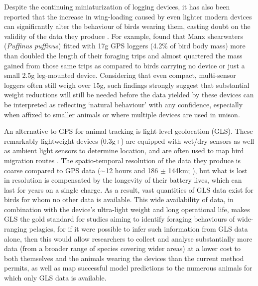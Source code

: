 \documentclass[11pt]{article}
\begin{document}
    Despite the continuing miniaturization of logging devices, it has also been reported that the increase in wing-loading caused by even lighter modern devices can significantly alter the behaviour of birds wearing them, casting doubt on the validity of the data they produce \citep{barron2010meta,phillips2003effects,calvo1992review,jackson2002potential}. For example, \cite{gillies2020short} found that Manx shearwaters (\emph{Puffinus puffinus}) fitted with 17g GPS loggers (4.2\% of bird body mass) more than doubled the length of their foraging trips and almost quartered the mass gained from those same trips as compared to birds carrying no device or just a small 2.5g leg-mounted device. Considering that even compact, multi-sensor loggers often still weigh over 15g, such findings strongly suggest that substantial weight reductions will still be needed before the data yielded by these devices can be interpreted as reflecting ‘natural behaviour’ with any confidence, especially when affixed to smaller animals or where multiple devices are used in unison.
    
    An alternative to GPS for animal tracking is light-level geolocation (GLS). These remarkably lightweight devices (0.3g+) are equipped with wet/dry sensors as well as ambient light sensors to determine location, and are often used to map bird migration routes \citep{newton2010migration,aakesson2012migration,minton2010initial,bachler2010year,jahn2013long}. 
    The spatio-temporal resolution of the data they produce is coarse compared to GPS data ($\sim$12 hours and 186 $\pm$ 144km; \cite{phillips2004accuracy}), but what is lost in resolution is compensated by the longevity of their battery lives, which can last for years on a single charge. As a result, vast quantities of GLS data exist for birds for whom no other data is available. This wide availability of data, in combination with the device's ultra-light weight and long operational life, makes GLS the gold standard for studies aiming to identify foraging behaviours of wide-ranging pelagics, for if it were possible to infer such information from GLS data alone, then this would allow researchers to collect and analyse substantially more data (from a broader range of species covering wider areas) at a lower cost to both themselves and the animals wearing the devices than the current method permits, as well as map successful model predictions to the numerous animals for which only GLS data is available.
    
\end{document}
